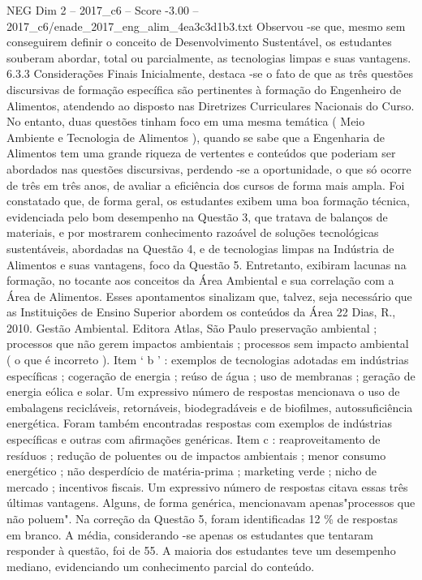 \begin{textsample}{NEG Dim 2 – 2017\_c6 – Score -3.00 – 2017\_c6/enade\_2017\_eng\_alim\_4ea3c3d1b3.txt}
Observou -se que, mesmo sem conseguirem definir o conceito de Desenvolvimento Sustentável, os estudantes souberam abordar, total ou parcialmente, as tecnologias limpas e suas vantagens. 6.3.3 Considerações Finais Inicialmente, destaca -se o fato de que as três questões discursivas de formação específica são pertinentes à formação do Engenheiro de Alimentos, atendendo ao disposto nas Diretrizes Curriculares Nacionais do Curso.
No entanto, duas questões tinham foco em uma mesma temática ( Meio Ambiente e Tecnologia de Alimentos ), quando se sabe que a Engenharia de Alimentos tem uma grande riqueza de vertentes e conteúdos que poderiam ser abordados nas questões discursivas, perdendo -se a oportunidade, o que só ocorre de três em três anos, de avaliar a eficiência dos cursos de forma mais ampla.
Foi constatado que, de forma geral, os estudantes exibem uma boa formação técnica, evidenciada pelo bom desempenho na Questão 3, que tratava de balanços de materiais, e por mostrarem conhecimento razoável de soluções tecnológicas sustentáveis, abordadas na Questão 4, e de tecnologias limpas na Indústria de Alimentos e suas vantagens, foco da Questão 5.
Entretanto, exibiram lacunas na formação, no tocante aos conceitos da Área Ambiental e sua correlação com a Área de Alimentos.
Esses apontamentos sinalizam que, talvez, seja necessário que as Instituições de Ensino Superior abordem os conteúdos da Área 22 Dias, R., 2010.
Gestão Ambiental.
Editora Atlas, São Paulo preservação ambiental ; processos que não gerem impactos ambientais ; processos sem impacto ambiental ( o que é incorreto ).
Item ‘ b ’ : exemplos de tecnologias adotadas em indústrias específicas ; cogeração de energia ; reúso de água ; uso de membranas ; geração de energia eólica e solar.
Um expressivo número de respostas mencionava o uso de embalagens recicláveis, retornáveis, biodegradáveis e de biofilmes, autossuficiência energética.
Foram também encontradas respostas com exemplos de indústrias específicas e outras com afirmações genéricas.
Item c : reaproveitamento de resíduos ; redução de poluentes ou de impactos ambientais ; menor consumo energético ; não desperdício de matéria-prima ; marketing verde ; nicho de mercado ; incentivos fiscais.
Um expressivo número de respostas citava essas três últimas vantagens.
Alguns, de forma genérica, mencionavam apenas"processos que não poluem".
Na correção da Questão 5, foram identificadas 12 \% de respostas em branco.
A média, considerando -se apenas os estudantes que tentaram responder à questão, foi de 55.
A maioria dos estudantes teve um desempenho mediano, evidenciando um conhecimento parcial do conteúdo.

\end{textsample}
